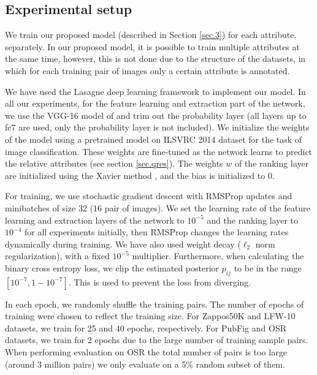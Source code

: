 \documentclass[runningheads]{llncs}
\begin{document}
\subsection{Experimental setup}
We train our proposed model (described in Section \ref{sec.3}) for each attribute, separately. In our proposed model, it is possible  to train multiple attributes at the same time, however, this is not done due to the structure of the datasets, in which for each training pair of images only a certain attribute is annotated.

We have used the Lasagne \cite{lasagne} deep learning framework to implement our model. 
In all our experiments, for the feature learning and extraction part of the network,
we use the VGG-16 model of \cite{verydeep} and trim out the probability layer (all layers up to fc7 are used, only the probability layer is not included).
We initialize the weights of the model using a pretrained model on ILSVRC 2014 dataset \cite{ilsvrc2014} for the task of image classification. These weights are fine-tuned as the network learns to predict the relative attributes (see section \ref{sec.qres}). The weights $w$ of the ranking layer are initialized using the Xavier method \cite{glorot}, and the bias is initialized to 0.

For training, we use stochastic gradient descent with RMSProp \cite{Tieleman2012} updates and minibatches of size 32 (16 pair of images).
We set the learning rate of the feature learning and extraction layers of the network to $10^{-5}$ and the ranking layer to $10^{-4}$ for all experiments initially, then RMSProp changes the learning rates dynamically during training. We have also used weight decay ($\ell_2$ norm regularization), with a fixed $10^{-5}$ multiplier. Furthermore, when calculating the binary cross entropy loss, we clip the estimated posterior $p_{ij}$ to be in the range $[10^{-7}, 1 - 10^{-7}]$. This is used to prevent the loss from diverging.

In each epoch, we randomly shuffle the training pairs. The number of epochs of training were chosen to reflect the training size. For Zappos50K and LFW-10 datasets, we train for 25 and 40 epochs, respectively. For PubFig and OSR datasets, we train for 2 epochs due to the large number of training sample pairs. When performing evaluation on OSR the total number of pairs is too large (around 3 million pairs) we only evaluate on a 5\% random subset of them. 
\end{document}
